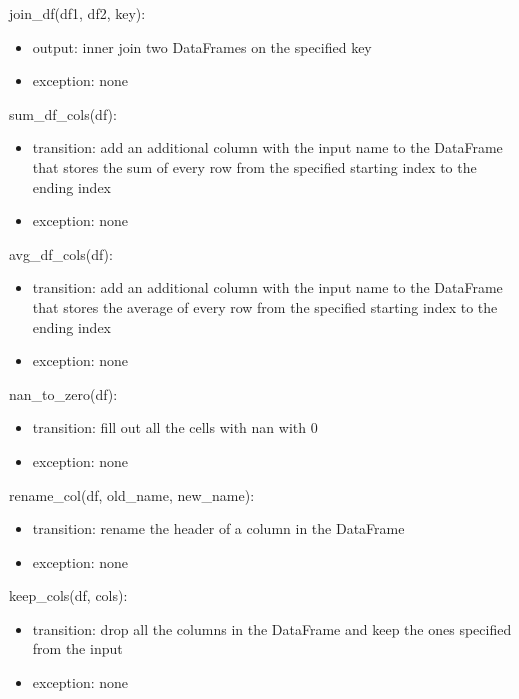 \documentclass[12pt]{article}
\begin{document}
\noindent join\_df(df1, df2, key):
\begin{itemize}
    \item output: inner join two DataFrames on the specified key
    \item exception: none
\end{itemize}

\noindent sum\_df\_cols(df):
\begin{itemize}
    \item transition: add an additional column with the input name to the DataFrame that stores the sum of 
    every row from the specified starting index to the ending index
    \item exception: none
\end{itemize}

\noindent avg\_df\_cols(df):
\begin{itemize}
    \item transition: add an additional column with the input name to the DataFrame that stores the average of 
    every row from the specified starting index to the ending index
    \item exception: none
\end{itemize}

\noindent nan\_to\_zero(df):
\begin{itemize}
    \item transition: fill out all the cells with nan with $0$
    \item exception: none
\end{itemize}

\noindent rename\_col(df, old\_name, new\_name):
\begin{itemize}
    \item transition: rename the header of a column in the DataFrame
    \item exception: none
\end{itemize}

\noindent keep\_cols(df, cols):
\begin{itemize}
    \item transition: drop all the columns in the DataFrame and keep the ones specified from the input
    \item exception: none
\end{itemize}

\end{document}
